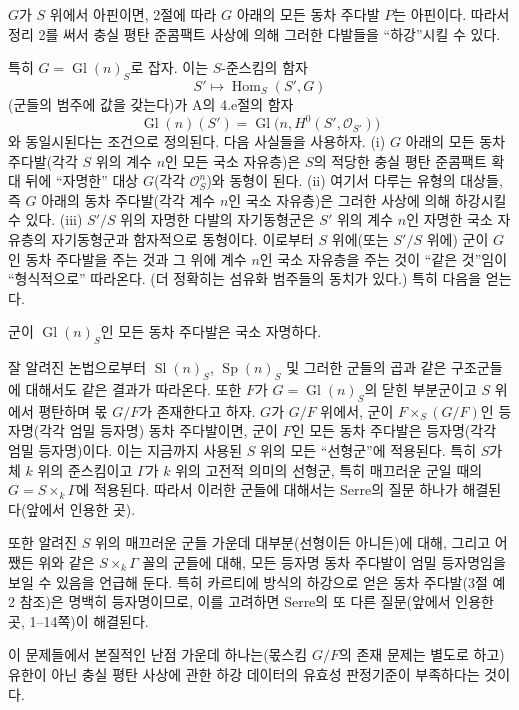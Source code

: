 $G$가 $S$ 위에서 아핀이면, 2절에 따라 $G$ 아래의 모든 동차 주다발
$P$는 아핀이다. 따라서 정리 2를 써서 충실 평탄 준콤팩트 사상에 의해
그러한 다발들을 ``하강''시킬 수 있다.

특히 $G=\operatorname{Gl}(n)_S$로 잡자. 이는 $S$-준스킴의 함자
\[
  S'\longmapsto\operatorname{Hom}_S(S',G)
\]
(군들의 범주에 값을 갖는다)가 A의 4.e절의 함자
\[
  \operatorname{Gl}(n)(S')
  =\operatorname{Gl}\bigl(n,H^0(S',\mathcal O_{S'})\bigr)
\]
와 동일시된다는 조건으로 정의된다. 다음 사실들을 사용하자. (i) $G$
아래의 모든 동차 주다발(각각 $S$ 위의 계수 $n$인 모든 국소 자유층)은
$S$의 적당한 충실 평탄 준콤팩트 확대 뒤에 ``자명한'' 대상 $G$(각각
$\mathcal O_S^n$)와 동형이 된다. (ii) 여기서 다루는 유형의 대상들,
즉 $G$ 아래의 동차 주다발(각각 계수 $n$인 국소 자유층)은 그러한
사상에 의해 하강시킬 수 있다. (iii) $S'/S$ 위의 자명한 다발의
자기동형군은 $S'$ 위의 계수 $n$인 자명한 국소 자유층의 자기동형군과
함자적으로 동형이다. 이로부터 $S$ 위에(또는 $S'/S$ 위에) 군이 $G$인
동차 주다발을 주는 것과 그 위에 계수 $n$인 국소 자유층을 주는 것이
``같은 것''임이 ``형식적으로'' 따라온다. (더 정확히는 섬유화 범주들의
동치가 있다.) 특히 다음을 얻는다.

 군이 $\operatorname{Gl}(n)_S$인 모든 동차 주다발은
국소 자명하다.

잘 알려진 논법으로부터 $\operatorname{Sl}(n)_S$,
$\operatorname{Sp}(n)_S$ 및 그러한 군들의 곱과 같은 구조군들에 대해서도
같은 결과가 따라온다. 또한 $F$가 $G=\operatorname{Gl}(n)_S$의 닫힌
부분군이고 $S$ 위에서 평탄하며 몫 $G/F$가 존재한다고 하자. $G$가
$G/F$ 위에서, 군이 $F\times_S(G/F)$인 등자명(각각 엄밀 등자명) 동차
주다발이면, 군이 $F$인 모든 동차 주다발은 등자명(각각 엄밀 등자명)이다.
이는 지금까지 사용된 $S$ 위의 모든 ``선형군''에 적용된다. 특히 $S$가
체 $k$ 위의 준스킴이고 $\Gamma$가 $k$ 위의 고전적 의미의 선형군,
특히 매끄러운 군일 때의 $G=S\times_k\Gamma$에 적용된다. 따라서 이러한
군들에 대해서는 Serre의 질문 하나가 해결된다(앞에서 인용한 곳).

또한 알려진 $S$ 위의 매끄러운 군들 가운데 대부분(선형이든 아니든)에
대해, 그리고 어쨌든 위와 같은 $S\times_k\Gamma$ 꼴의 군들에 대해,
모든 등자명 동차 주다발이 엄밀 등자명임을 보일 수 있음을 언급해 둔다.
특히 카르티에 방식의 하강으로 얻은 동차 주다발(3절 예 2 참조)은 명백히
등자명이므로, 이를 고려하면 Serre의 또 다른 질문(앞에서 인용한 곳,
1--14쪽)이 해결된다.

 이 문제들에서 본질적인 난점 가운데 하나는(몫스킴
$G/F$의 존재 문제는 별도로 하고) 유한이 아닌 충실 평탄 사상에 관한
하강 데이터의 유효성 판정기준이 부족하다는 것이다.

